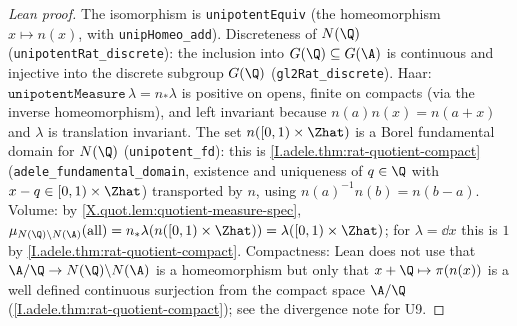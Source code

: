\begin{proof}[Lean proof]
The isomorphism is \texttt{unipotentEquiv} (the homeomorphism $x\mapsto n(x)$, with \texttt{unipHomeo\_add}). Discreteness of $N(\Q)$ (\texttt{unipotentRat\_discrete}): the inclusion into $G(\Q)\subseteq G(\A)$ is continuous and injective into the discrete subgroup $G(\Q)$ (\texttt{gl2Rat\_discrete}). Haar: $\texttt{unipotentMeasure}\,\lambda=n_*\lambda$ is positive on opens, finite on compacts (via the inverse homeomorphism), and left invariant because $n(a)n(x)=n(a+x)$ and $\lambda$ is translation invariant. The set $n([0,1)\times\Zhat)$ is a Borel fundamental domain for $N(\Q)$ (\texttt{unipotent\_fd}): this is \cref{I.adele.thm:rat-quotient-compact} (\texttt{adele\_fundamental\_domain}, existence and uniqueness of $q\in\Q$ with $x-q\in[0,1)\times\Zhat$) transported by $n$, using $n(a)^{-1}n(b)=n(b-a)$. Volume: by \cref{X.quot.lem:quotient-measure-spec}, $\mu_{N(\Q)\backslash N(\A)}(\text{all})=n_*\lambda(n([0,1)\times\Zhat))=\lambda([0,1)\times\Zhat)$; for $\lambda=\dd x$ this is $1$ by \cref{I.adele.thm:rat-quotient-compact}. Compactness: Lean does not use that $\A/\Q\to N(\Q)\backslash N(\A)$ is a homeomorphism but only that $x+\Q\mapsto\pi(n(x))$ is a well defined continuous surjection from the compact space $\A/\Q$ (\cref{I.adele.thm:rat-quotient-compact}); see the divergence note for U9.
\end{proof}

